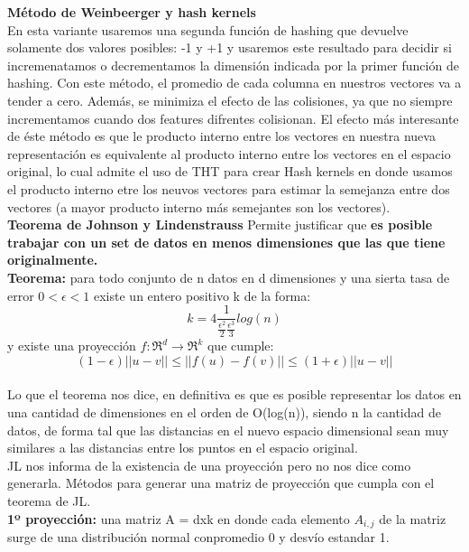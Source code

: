 \documentclass[titlepage,a4paper]{article}
\begin{document}
\textbf{Método de Weinbeerger y hash kernels}\\

En esta variante usaremos una segunda función de hashing que devuelve solamente dos valores posibles: -1 y +1 y usaremos este resultado para decidir si incremenatamos o decrementamos la dimensión indicada por la primer función de hashing. Con este método, el promedio de cada columna en nuestros vectores va a tender a cero. Además, se minimiza el efecto de las colisiones, ya que no siempre incrementamos cuando dos features difrentes colisionan. El efecto más interesante de éste método es que le producto interno entre los vectores en nuestra nueva representación es equivalente al producto interno entre los vectores en el espacio original, lo cual admite el uso de THT para crear Hash kernels en donde usamos el producto interno etre los neuvos vectores para estimar la semejanza entre dos vectores (a mayor producto interno más semejantes son los vectores).\\

\textbf{Teorema de Johnson y Lindenstrauss}
Permite justificar que \textbf{es posible trabajar con un set de datos en menos dimensiones que las que tiene originalmente.}\\

\textbf{Teorema:} para todo conjunto de n datos en d dimensiones y una sierta tasa de error $0<\epsilon <1$ existe un entero positivo k de la forma: $$ k = 4\frac{1}{\frac{\epsilon^2}{2} \frac{\epsilon^3}{3}} log(n)$$
y existe una proyección $f: \Re^d\rightarrow \Re^k$ que cumple: $$(1-\epsilon) ||u-v|| \leq ||f(u)-f(v)|| \leq (1+\epsilon) ||u-v|| $$\\


Lo que el teorema nos dice, en definitiva es que es posible representar los datos en una cantidad de dimensiones en el orden de O(log(n)), siendo n la cantidad de datos, de forma tal que las distancias en el nuevo espacio dimensional sean muy similares a las distancias entre los puntos en el espacio original. \\

JL nos informa de la existencia de una proyección pero no nos dice como generarla. Métodos para generar una matriz de proyección que cumpla con el teorema de JL. \\

\textbf{1º proyección:} una matriz A = dxk en donde cada elemento $A_{i,j}$ de la matriz surge de una distribución normal conpromedio 0 y desvío estandar 1.\\
\end{document}
